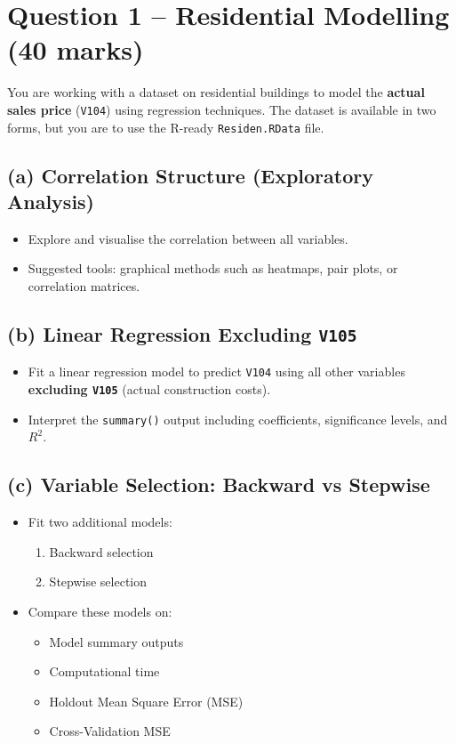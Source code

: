 
\section*{Question 1 – Residential Modelling (40 marks)}

You are working with a dataset on residential buildings to model the \textbf{actual sales price} (\texttt{V104}) using regression techniques. The dataset is available in two forms, but you are to use the R-ready \texttt{Residen.RData} file.

\subsection*{(a) Correlation Structure (Exploratory Analysis)}
\begin{itemize}
  \item Explore and visualise the correlation between all variables.
  \item Suggested tools: graphical methods such as heatmaps, pair plots, or correlation matrices.
\end{itemize}

\subsection*{(b) Linear Regression Excluding \texttt{V105}}
\begin{itemize}
  \item Fit a linear regression model to predict \texttt{V104} using all other variables \textbf{excluding \texttt{V105}} (actual construction costs).
  \item Interpret the \texttt{summary()} output including coefficients, significance levels, and $R^2$.
\end{itemize}

\subsection*{(c) Variable Selection: Backward vs Stepwise}
\begin{itemize}
  \item Fit two additional models:
  \begin{enumerate}
    \item Backward selection
    \item Stepwise selection
  \end{enumerate}
  \item Compare these models on:
  \begin{itemize}
    \item Model summary outputs
    \item Computational time
    \item Holdout Mean Square Error (MSE)
    \item Cross-Validation MSE
  \end{itemize}
\end{itemize}

